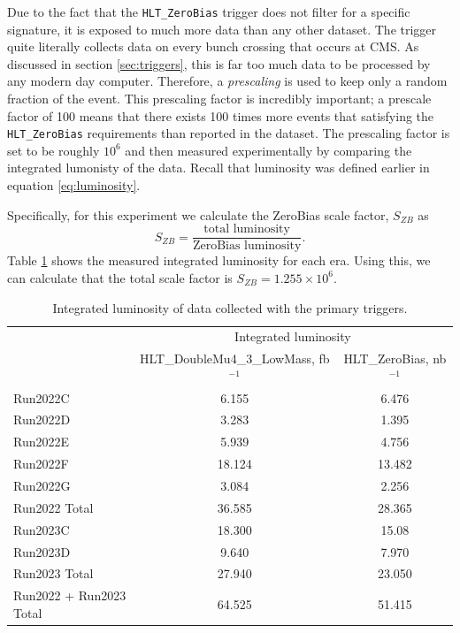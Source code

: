 Due to the fact that the \texttt{HLT\_ZeroBias} trigger does not filter for a specific signature, it is exposed to much more data than any other dataset. The trigger quite literally collects data on every bunch crossing that occurs at CMS. As discussed in section \ref{sec:triggers}, this is far too much data to be processed by any modern day computer. Therefore, a \textit{prescaling} is used to keep only a random fraction of the event. This prescaling factor is incredibly important; a prescale factor of 100 means that there exists 100 times more events that satisfying the \texttt{HLT\_ZeroBias} requirements than reported in the dataset. The prescaling factor is set to be roughly $10^{6}$ and then measured experimentally by comparing the integrated lumonisty of the data. Recall that luminosity was defined earlier in equation \ref{eq:luminosity}. 

Specifically, for this experiment we calculate the ZeroBias scale factor, $S_{ZB}$ as 
\begin{equation}
    S_{ZB} = \frac{\text{total luminosity}}{\text{ZeroBias luminosity}}.
\end{equation}
Table \ref{tab:int_lumi_final} shows the measured integrated luminosity for each era. Using this, we can calculate that the total scale factor is $S_{ZB} = 1.255 \times 10^6$.

\begin{table}[htbp]
    \centering
    \begin{tabular}{|l|c|c|}
        \hline
         & \multicolumn{2}{c|}{Integrated luminosity} \\
        \cline{2-3}
         & HLT\_DoubleMu4\_3\_LowMass, fb$^{-1}$ & HLT\_ZeroBias, nb$^{-1}$ \\
        \hline
        Run2022C      & 6.155  & 6.476 \\
        Run2022D      & 3.283  & 1.395 \\
        Run2022E      & 5.939  & 4.756 \\
        Run2022F      & 18.124 & 13.482 \\
        Run2022G      & 3.084  & 2.256 \\
        \hline
        Run2022 Total & 36.585 & 28.365 \\
        \hline
        Run2023C      & 18.300 & 15.08 \\
        Run2023D      & 9.640  & 7.970 \\
        \hline
        Run2023 Total & 27.940 & 23.050 \\
        \hline
        Run2022 + Run2023 Total & 64.525 & 51.415 \\
        \hline
    \end{tabular}
    \caption{Integrated luminosity of data collected with the primary triggers.}
    \label{tab:int_lumi_final}
\end{table}

